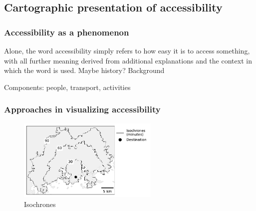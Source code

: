 

\subsection{Cartographic presentation of accessibility}

\subsubsection{Accessibility as a phenomenon}

Alone, the word accessibility simply refers to how easy it is to access something,
with all further meaning derived from
additional explanations and the context in which the word is used.
Maybe history? Background \parencite{ten2020}

Components: people, transport, activities \parencite{jar2018}




\subsubsection{Approaches in visualizing accessibility}



\begin{figure}[H]
	\centering
	\includegraphics[width=0.6\textwidth]{visual/figures/ttm/isochrone_lines.pdf}
	\caption{Isochrones}
	\label{fig:isochrone lines}
\end{figure}

